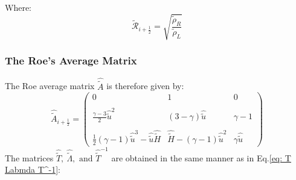 \documentclass[11pt, a4paper]{article}
\begin{document}
Where:
\begin{equation*}
    \tilde{\mathcal{R}}_{i+\frac{1}{2}}=\sqrt{\displaystyle\frac{\tilde{\rho}_R}{\tilde{\rho}_L}}
\end{equation*}

\subsubsection{The Roe's Average Matrix}
The Roe average matrix $\hat{\tilde{A}}$ is therefore given by:
\begin{equation}
    \hat{\tilde{A}}_{i+\frac{1}{2}}=\begin{pmatrix}
        0 & 1 & 0 \\\\
        \displaystyle\frac{\gamma-3}{2}\hat{\tilde{u}}^2 & \left(3-\gamma\right)\hat{\tilde{u}} & \gamma-1 \\\\
        \displaystyle\frac{1}{2}\left(\gamma-1\right)\hat{\tilde{u}}^3-\hat{\tilde{u}}\hat{\tilde{H}} & \hat{\tilde{H}}-\left(\gamma-1\right)\hat{\tilde{u}}^2 & \gamma\hat{\tilde{u}}
    \end{pmatrix}
\end{equation}
The matrices $\hat{\tilde{T}},\ \hat{\tilde{\Lambda}},\text{ and }\hat{\tilde{T}}^{-1}$ are obtained in the same manner as in Eq.\ref{eq: T Labmda T^-1}:
\end{document}
